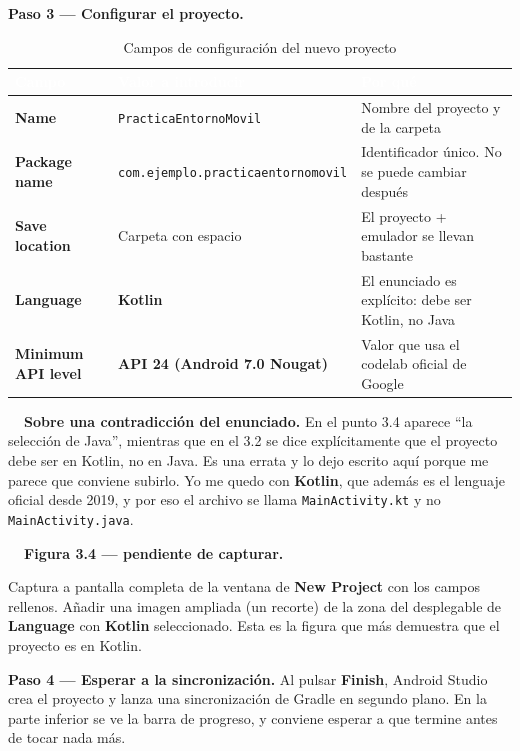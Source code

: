 \documentclass[11pt,a4paper]{article}
\newcommand{\archivo}[1]{\texttt{\color{accent!85!black}#1}}
\newcommand{\campo}[1]{\textbf{\color{primary}#1}}
\newcommand{\figpend}[2]{%
	\begin{capturabox}
		\textbf{\color{accent2!70!black}\faCamera\ \ Figura #1 --- pendiente de capturar.}%
		\par\smallskip #2
	\end{capturabox}%
}
\begin{document}
	\campo{Paso 3 --- Configurar el proyecto.}
	
	\begin{table}[htbp]
		\centering
		\small
		\begin{tabularx}{\textwidth}{@{}>{\RaggedRight\arraybackslash}p{3cm} >{\RaggedRight\arraybackslash}p{5cm} >{\RaggedRight\arraybackslash}X@{}}
			\toprule
			\rowcolor{primary}
			\textcolor{white}{\sffamily\bfseries Campo} & \textcolor{white}{\sffamily\bfseries Valor a introducir} & \textcolor{white}{\sffamily\bfseries Por qué} \\
			\midrule
			\textbf{Name} & \archivo{PracticaEntornoMovil} & Nombre del proyecto y de la carpeta \\
			\rowcolor{soft}
			\textbf{Package name} & \archivo{com.ejemplo.practicaentornomovil} & Identificador único. No se puede cambiar después \\
			\textbf{Save location} & Carpeta con espacio & El proyecto + emulador se llevan bastante \\
			\rowcolor{soft}
			\textbf{Language} & \textbf{Kotlin} & El enunciado es explícito: debe ser Kotlin, no Java \\
			\textbf{Minimum API level} & \textbf{API 24 (Android 7.0 Nougat)} & Valor que usa el codelab oficial de Google \\
			\bottomrule
		\end{tabularx}
		\caption{Campos de configuración del nuevo proyecto}
	\end{table}
	
	\begin{warnbox}
		\textbf{\color{accent!80!black}\faExclamationTriangle\ \ Sobre una contradicción del enunciado.}
		En el punto 3.4 aparece \enquote{la selección de Java}, mientras que en el 3.2 se dice explícitamente que el proyecto debe ser en Kotlin, no en Java. Es una errata y lo dejo escrito aquí porque me parece que conviene subirlo. Yo me quedo con \textbf{Kotlin}, que además es el lenguaje oficial desde 2019, y por eso el archivo se llama \archivo{MainActivity.kt} y no \archivo{MainActivity.java}.
	\end{warnbox}
	
	\figpend{3.4}{Captura a pantalla completa de la ventana de \textbf{New Project} con los campos rellenos. Añadir una imagen ampliada (un recorte) de la zona del desplegable de \textbf{Language} con \textbf{Kotlin} seleccionado. Esta es la figura que más demuestra que el proyecto es en Kotlin.}
	
	\campo{Paso 4 --- Esperar a la sincronización.}
	Al pulsar \textbf{Finish}, Android Studio crea el proyecto y lanza una sincronización de Gradle en segundo plano. En la parte inferior se ve la barra de progreso, y conviene esperar a que termine antes de tocar nada más.
	
\end{document}

